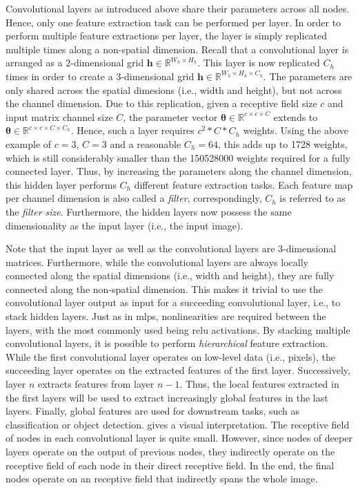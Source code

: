 Convolutional layers as introduced above share their parameters across all nodes. Hence, only one feature extraction task can be performed per layer. In order to perform multiple feature extractions per layer, the layer is simply replicated multiple times along a non-spatial dimension. Recall that a convolutional layer is arranged as a 2-dimensional grid $\textbf{h}\in\mathbb{R}^{W_h\times H_h}$. This layer is now replicated $C_h$ times in order to create a 3-dimensional grid $\textbf{h}\in\mathbb{R}^{W_h\times H_h\times C_h}$. The parameters are only shared across the spatial dimesions (i.e., width and height), but not across the channel dimension. Due to this replication, given a receptive field size $c$ and input matrix channel size $C$, the parameter vector $\boldsymbol{\theta} \in \mathbb{R}^{c\times c\times C}$ extends to $\boldsymbol{\theta} \in \mathbb{R}^{c\times c\times C\times C_h}$. Hence, such a layer requires $c^2*C*C_h$ weights. Using the above example of $c=3$, $C=3$ and a reasonable $C_h=64$, this adds up to 1728 weights, which is still considerably smaller than the 150528000 weights required for a fully connected layer. Thus, by increasing the parameters along the channel dimension, this hidden layer performs $C_h$ different feature extraction tasks. Each feature map per channel dimension is also called a \emph{filter}, correspondingly, $C_h$ is referred to as the \emph{filter size}. Furthermore, the hidden layers now possess the same dimensionality as the input layer (i.e., the input image).

Note that the input layer as well as the convolutional layers are 3-dimensional matrices. Furthermore, while the convolutional layers are always locally connected along the spatial dimensions (i.e., width and height), they are fully connected along the non-spatial dimension. This makes it trivial to use the convolutional layer output as input for a succeeding convolutional layer, i.e., to stack hidden layers. Just as in \glspl{mlp}, nonlinearities are required between the layers, with the most commonly used being \gls{relu} activations. By stacking multiple convolutional layers, it is possible to perform \emph{hierarchical} feature extraction. While the first convolutional layer operates on low-level data (i.e., pixels), the succeeding layer operates on the extracted features of the first layer. Successively, layer $n$ extracts features from layer $n-1$. Thus, the local features extracted in the first layers will be used to extract increasingly global features in the last layers. Finally, global features are used for downstream tasks, such as classification or object detection.  gives a visual interpretation. The receptive field of nodes in each convolutional layer is quite small. However, since nodes of deeper layers operate on the output of previous nodes, they indirectly operate on the receptive field of each node in their direct receptive field. In the end, the final nodes operate on an receptive field that indirectly spans the whole image.

